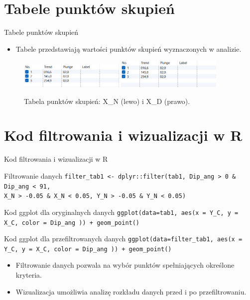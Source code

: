 \documentclass{beamer}
\begin{document}
\section{Tabele punktów skupień}
\begin{frame}{Tabele punktów skupień}
    \begin{itemize}
        \item Tabele przedstawiają wartości punktów skupień wyznaczonych w analizie.
    \end{itemize}
    \begin{figure}
        \centering
        \includegraphics[width=0.45\textwidth]{X_N_measure.png}
        \includegraphics[width=0.45\textwidth]{X_D_measure.png}
        \caption{Tabela punktów skupień: X\_N (lewo) i X\_D (prawo).}
    \end{figure}
\end{frame}


\section{Kod filtrowania i wizualizacji w R}
\begin{frame}{Kod filtrowania i wizualizacji w R}
    \begin{block}{Filtrowanie danych}
        \texttt{filter\_tab1 <- dplyr::filter(tab1, Dip\_ang > 0 \& Dip\_ang < 91,}\\
        \texttt{X\_N > -0.05 \& X\_N < 0.05, Y\_N > -0.05 \& Y\_N < 0.05)}
    \end{block}
    \begin{block}{Kod ggplot dla oryginalnych danych}
        \texttt{ggplot(data=tab1, aes(x = Y\_C, y = X\_C, color = Dip\_ang )) + geom\_point()}
    \end{block}
    \begin{block}{Kod ggplot dla przefiltrowanych danych}
        \texttt{ggplot(data=filter\_tab1, aes(x = Y\_C, y = X\_C, color = Dip\_ang )) + geom\_point()}
    \end{block}
    \begin{itemize}
        \item Filtrowanie danych pozwala na wybór punktów spełniających określone kryteria.
        \item Wizualizacja umożliwia analizę rozkładu danych przed i po przefiltrowaniu.
    \end{itemize}
\end{frame}
\end{document}
